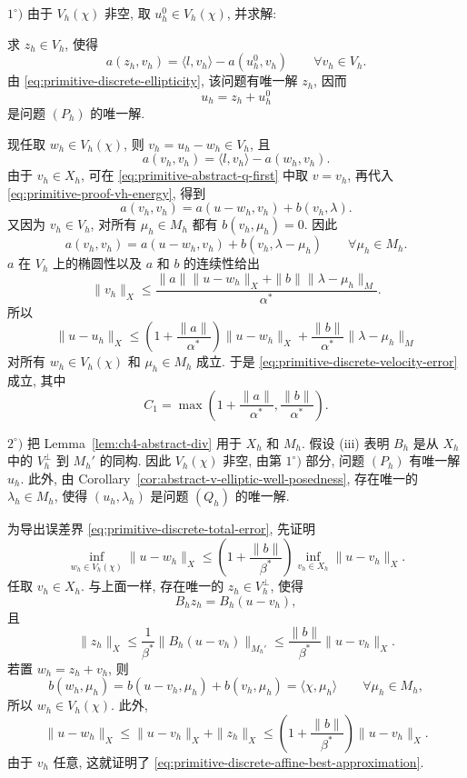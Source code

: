 \begin{Proof}
$1^\circ)$ 由于 $V_h(\chi)$ 非空, 取 $u_h^0\in V_h(\chi)$, 并求解:

求 $z_h\in V_h$, 使得
\[
a(z_h,v_h)=\langle l,v_h\rangle-a(u_h^0,v_h)
\qquad\forall v_h\in V_h.
\]
由 \eqref{eq:primitive-discrete-ellipticity}, 该问题有唯一解 $z_h$, 因而
\[
u_h=z_h+u_h^0
\]
是问题 $(P_h)$ 的唯一解.

现任取 $w_h\in V_h(\chi)$, 则 $v_h=u_h-w_h\in V_h$, 且
\begin{equation}\label{eq:primitive-proof-vh-energy}
a(v_h,v_h)=\langle l,v_h\rangle-a(w_h,v_h).
\end{equation}
由于 $v_h\in X_h$, 可在 \eqref{eq:primitive-abstract-q-first} 中取 $v=v_h$,
再代入 \eqref{eq:primitive-proof-vh-energy}, 得到
\[
a(v_h,v_h)=a(u-w_h,v_h)+b(v_h,\lambda).
\]
又因为 $v_h\in V_h$, 对所有 $\mu_h\in M_h$ 都有 $b(v_h,\mu_h)=0$. 因此
\begin{equation}\label{eq:primitive-proof-vh-error-identity}
a(v_h,v_h)=a(u-w_h,v_h)+b(v_h,\lambda-\mu_h)
\qquad\forall\mu_h\in M_h.
\end{equation}
$a$ 在 $V_h$ 上的椭圆性以及 $a$ 和 $b$ 的连续性给出
\[
\|v_h\|_X
\leq\frac{\|a\|\|u-w_h\|_X+\|b\|\|\lambda-\mu_h\|_M}{\alpha^*}.
\]
所以
\[
\|u-u_h\|_X
\leq\left(1+\frac{\|a\|}{\alpha^*}\right)\|u-w_h\|_X
+\frac{\|b\|}{\alpha^*}\|\lambda-\mu_h\|_M
\]
对所有 $w_h\in V_h(\chi)$ 和 $\mu_h\in M_h$ 成立. 于是
\eqref{eq:primitive-discrete-velocity-error} 成立, 其中
\[
C_1=\max\left(1+\frac{\|a\|}{\alpha^*},\frac{\|b\|}{\alpha^*}\right).
\]

$2^\circ)$ 把 Lemma~\ref{lem:ch4-abstract-div} 用于 $X_h$ 和 $M_h$.
假设 (iii) 表明 $B_h$ 是从 $X_h$ 中的 $V_h^\perp$ 到 $M_h'$ 的同构.
因此 $V_h(\chi)$ 非空, 由第 $1^\circ)$ 部分, 问题 $(P_h)$ 有唯一解 $u_h$.
此外, 由 Corollary~\ref{cor:abstract-v-elliptic-well-posedness},
存在唯一的 $\lambda_h\in M_h$, 使得 $(u_h,\lambda_h)$ 是问题 $(Q_h)$ 的唯一解.

为导出误差界 \eqref{eq:primitive-discrete-total-error}, 先证明
\begin{equation}\label{eq:primitive-discrete-affine-best-approximation}
\inf_{w_h\in V_h(\chi)}\|u-w_h\|_X
\leq\left(1+\frac{\|b\|}{\beta^*}\right)
\inf_{v_h\in X_h}\|u-v_h\|_X.
\end{equation}
任取 $v_h\in X_h$. 与上面一样, 存在唯一的 $z_h\in V_h^\perp$, 使得
\[
B_hz_h=B_h(u-v_h),
\]
且
\[
\|z_h\|_X
\leq\frac{1}{\beta^*}\|B_h(u-v_h)\|_{M_h'}
\leq\frac{\|b\|}{\beta^*}\|u-v_h\|_X.
\]
若置 $w_h=z_h+v_h$, 则
\[
b(w_h,\mu_h)
=b(u-v_h,\mu_h)+b(v_h,\mu_h)
=\langle\chi,\mu_h\rangle
\qquad\forall\mu_h\in M_h,
\]
所以 $w_h\in V_h(\chi)$. 此外,
\[
\|u-w_h\|_X
\leq\|u-v_h\|_X+\|z_h\|_X
\leq\left(1+\frac{\|b\|}{\beta^*}\right)\|u-v_h\|_X.
\]
由于 $v_h$ 任意, 这就证明了 \eqref{eq:primitive-discrete-affine-best-approximation}.


\end{Proof}
